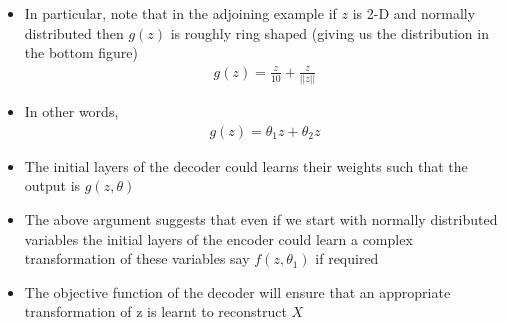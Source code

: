 \begin{frame}
\begin{columns}
		\begin{overlayarea}{\textwidth}{\textheight}
			\footnotesize{\begin{itemize}\justifying
				\item<1-> In particular, note that in the adjoining example if $z$ is 2-D and normally distributed then $g(z)$ is roughly ring shaped (giving us the distribution in the bottom figure)
				\vspace{-4mm}
				\begin{align*}
				g(z) = \frac{z}{10} + \frac{z}{||z||}
				\end{align*}
				\vspace{-6mm}
				\item<2-> In other words, 
				\vspace{-4mm}
				\begin{align*}
				g(z) = \theta_1 z + \theta_2 z
				\end{align*}
				\vspace{-8mm}
				\item<3-> The initial layers of the decoder could learns their weights such that the output is $g(z, \theta)$
				\item<4-> The above argument suggests that even if we start with normally distributed variables the initial layers of the encoder could learn a complex transformation of these variables say $f(z, \theta_1)$ if required
				\item<5-> The objective function of the decoder will ensure that an appropriate transformation of z is learnt to reconstruct $X$
			\end{itemize}}
		\end{overlayarea}
	\end{columns}
\end{frame}


